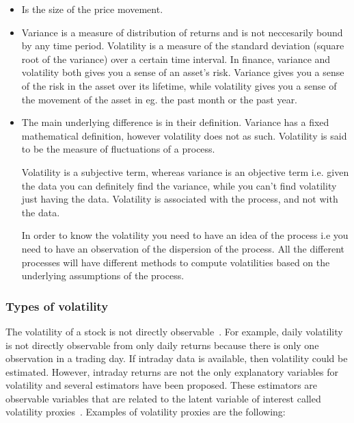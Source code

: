 \begin{itemize}

\item Is the size of the price movement.

\item Variance is a measure of distribution of returns and is not neccesarily bound by any time period.
Volatility is a measure of the standard deviation (square root of the variance) over a certain time interval. In finance, variance and volatility both gives you a sense of an asset's risk. Variance gives you a sense of the risk in the asset over its lifetime, while volatility gives you a sense of the movement of the asset in eg. the past month or the past year.


\item The main underlying difference is in their definition. Variance has a fixed mathematical definition, however volatility does not as such. Volatility is said to be the measure of fluctuations of a process.

Volatility is a subjective term, whereas variance is an objective term i.e. given the data you can definitely find the variance, while you can't find volatility just having the data. Volatility is associated with the process, and not with the data.

In order to know the volatility you need to have an idea of the process i.e you need to have an observation of the dispersion of the process. All the different processes will have different methods to compute volatilities based on the underlying assumptions of the process.
\end{itemize}



\subsubsection{Types of volatility}

The volatility of a stock is not directly observable~\cite{tsay2005,engle1993}. For example, daily volatility is not directly observable from only daily returns because there is only one observation in a trading day.  If intraday data is available, then volatility could be estimated. However, intraday returns are not the only explanatory variables for volatility and several estimators have been proposed. These estimators are observable variables that are related to the latent variable of interest called volatility proxies~\cite{devilderetal2007}. Examples of volatility proxies are the following: 


